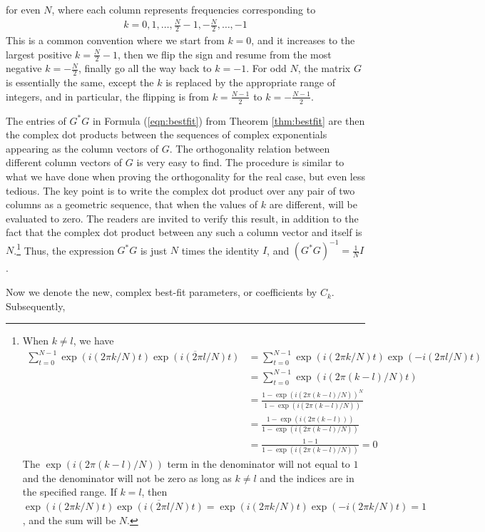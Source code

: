 for even $N$, where each column represents frequencies corresponding to 
\begin{align*}
k = 0, 1, \ldots, \frac{N}{2}-1, -\frac{N}{2}, \ldots, -1    
\end{align*}
This is a common convention where we start from $k = 0$, and it increases to the largest positive $k = \frac{N}{2}-1$, then we flip the sign and resume from the most negative $k = -\frac{N}{2}$, finally go all the way back to $k = -1$. For odd $N$, the matrix $G$ is essentially the same, except the $k$ is replaced by the appropriate range of integers, and in particular, the flipping is from $k = \frac{N-1}{2}$ to $k = -\frac{N-1}{2}$. \par
The entries of $G^*G$ in Formula (\ref{eqn:bestfit}) from Theorem \ref{thm:bestfit} are then the complex dot products between the sequences of complex exponentials appearing as the column vectors of $G$. The orthogonality relation between different column vectors of $G$ is very easy to find. The procedure is similar to what we have done when proving the orthogonality for the real case, but even less tedious. The key point is to write the complex dot product over any pair of two columns as a geometric sequence, that when the values of $k$ are different, will be evaluated to zero. The readers are invited to verify this result, in addition to the fact that the complex dot product between any such a column vector and itself is $N$.\footnote{When $k \neq l$, we have \begin{align*}
\sum_{t=0}^{N-1} \exp(i (2\pi k/N) t)\overline{\exp(i (2\pi l/N) t)} &= \sum_{t=0}^{N-1} \exp(i (2\pi k/N) t)\exp(-i (2\pi l/N) t) \\
&= \sum_{t=0}^{N-1} \exp(i (2\pi (k-l)/N) t) \\
&= \frac{1-\exp(i (2\pi (k-l)/N))^N}{1-\exp(i (2\pi (k-l)/N))} \\
&= \frac{1-\exp(i (2\pi (k-l)))}{1-\exp(i (2\pi (k-l)/N))} \\
&= \frac{1-1}{1-\exp(i (2\pi (k-l)/N))} = 0
\end{align*} The $\exp(i (2\pi (k-l)/N))$ term in the denominator will not equal to $1$ and the denominator will not be zero as long as $k \neq l$ and the indices are in the specified range. If $k = l$, then $\exp(i (2\pi k/N) t)\overline{\exp(i (2\pi l/N) t)} =  \exp(i (2\pi k/N) t)\exp(-i (2\pi k/N) t) = 1$, and the sum will be $N$.} Thus, the expression $G^*G$ is just $N$ times the identity $I$, and $(G^*G)^{-1} = \frac{1}{N} I$. \par
Now we denote the new, complex best-fit parameters, or coefficients by $C_k$. Subsequently,
